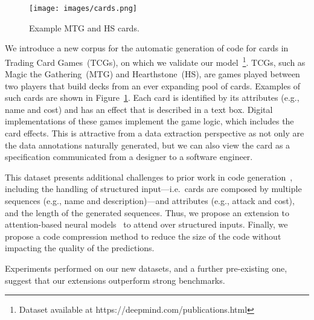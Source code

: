 \documentclass[11pt]{article}
\begin{document}
\begin{figure}[t!]
\begin{center}
\centerline{\texttt{[image: images/cards.png]}}
\caption{Example MTG and HS cards.}
\label{hs_img}
\end{center}
\end{figure}

We introduce a new corpus for the automatic generation
of code for cards in Trading Card Games~(TCGs), on which we validate our model~\footnote{Dataset available at https://deepmind.com/publications.html}. TCGs, such as Magic the
Gathering~(MTG) and Hearthstone~(HS), are games played between two players that
build decks from an ever expanding pool of cards. Examples of such cards are
shown in Figure~\ref{hs_img}.
Each card is identified by its attributes (e.g., name and cost) and
has an effect that is described in a text box. Digital implementations of these games implement the game logic, which includes the card effects. This is attractive from a data extraction perspective as not only are the data annotations naturally generated, but we can also view the card as a specification communicated from a designer to a software engineer.

This dataset presents additional challenges to prior work in code generation~\cite{Wong:2006:LSP:1220835.1220891,Jones:2012:SPB:2390524.2390593,lei-EtAl:2013:ACL2013,artzi-lee-zettlemoyer:2015:EMNLP,quirk:acl15}, including the handling of structured input---i.e.~cards are composed by multiple sequences (e.g., name and description)---and attributes (e.g., attack and cost), and the length of the generated sequences. Thus, we propose an extension to attention-based neural models~\cite{DBLP:journals/corr/BahdanauCB14} to attend over structured inputs. Finally, we propose a code compression method to reduce the size of the code without impacting the quality of the predictions.

Experiments performed on our new datasets, and a further pre-existing one, suggest that our extensions outperform strong benchmarks.
\end{document}
